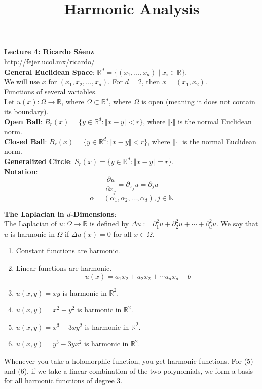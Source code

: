 \documentclass[12pt]{article}
\title{Harmonic Analysis}
\begin{document}
\noindent \textbf{Lecture 4: Ricardo S\'aenz} \\
\noindent http://fejer.ucol.mx/ricardo/ \\

\noindent \textbf{General Euclidean Space}: $\mathbb{R}^d = \{ (x_1, \dots, x_d) \mid x_i \in \mathbb{R}\}$.  \\

\noindent We will use $x$ for $(x_1,x_2,\dots, x_d)$. For $d=2$, then $x = (x_1, x_2)$.  \\

\noindent Functions of several variables. \\
\noindent Let $u(x): \Omega \rightarrow \mathbb{R}$, where $\Omega \subset \mathbb{R}^d$, where $\Omega$ is open (meaning it does not contain its boundary). \\

\noindent \textbf{Open Ball}: $B_r(x) = \{y \in \mathbb{R}^d : \Vert x-y \Vert < r \}$, where $\Vert \cdot \Vert$ is the normal Euclidean norm. \\

\noindent \textbf{Closed Ball}: $\overline{B}_r(x) = \{y \in \mathbb{R}^d : \Vert x-y \Vert < r \}$, where $\Vert \cdot \Vert$ is the normal Euclidean norm. \\

\noindent \textbf{Generalized Circle}: $S_r(x) = \{y \in \mathbb{R}^d : \Vert x-y \Vert = r\}$.  \\

\noindent \textbf{Notation}: 
$$\frac{\partial u }{\partial x_j} = \partial_{x_j}u = \partial_ju$$
$$\alpha = (\alpha_1, \alpha_2, \dots, \alpha_d), j \in \mathbb{N}$$

\noindent \textbf{The Laplacian in $d$-Dimensions}: \\
\noindent The Laplacian of $u:\Omega \rightarrow \mathbb{R}$ is defined by $\Delta u:= \partial^2_1 u + \partial^2_2 u + \cdots + \partial^2_d u$. We say that $u$ is harmonic in $\Omega$ if $\Delta u(x) = 0$ for all $x \in \Omega$. 
\begin{enumerate}[itemsep=0pt, parsep=0pt, partopsep=0pt, topsep=0pt]
\item Constant functions are harmonic.
\item Linear functions are harmonic.
$$ u(x)= a_1x_2 + a_2x_2 + \cdots a_dx_d + b $$
\item $u(x,y) = xy$ is harmonic in $\mathbb{R}^2$.
\item $u(x,y) = x^2 - y^2$ is harmonic in $\mathbb{R}^2$.
\item $u(x,y) = x^3 - 3xy^2$ is harmonic in $\mathbb{R}^2$. 
\item $u(x,y) = y^3 - 3yx^2$ is harmonic in $\mathbb{R}^2$. 
\end{enumerate}
Whenever you take a holomorphic function, you get harmonic functions. For (5) and (6), if we take a linear combination of the two polynomials, we form a basis for all harmonic functions of degree 3. \\
\end{document}
